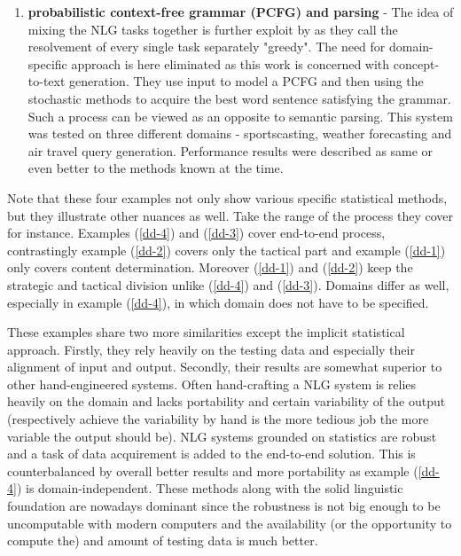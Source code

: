 \begin{enumerate}
	\item \textbf{probabilistic context-free grammar (PCFG) and parsing} - The idea of mixing the NLG tasks together is further exploit by \cite{konstas2013global} as they call the resolvement of every single task separately "greedy". The need for domain-specific approach is here eliminated as this work is concerned with concept-to-text generation. They use input to model a PCFG and then using the stochastic methods to acquire the best word sentence satisfying the grammar. Such a process can be viewed as an opposite to semantic parsing. This system was tested on three different domains - sportscasting, weather forecasting and air travel query generation. Performance results were described as same or even better to the methods known at the time.\label{dd-4}
\end{enumerate}
Note that these four examples not only show various specific statistical methods, but they illustrate other nuances as well. Take the range of the process they cover for instance. Examples (\ref{dd-4}) and (\ref{dd-3}) cover end-to-end process, contrastingly example (\ref{dd-2}) covers only the tactical part and example (\ref{dd-1}) only covers content determination. Moreover (\ref{dd-1}) and (\ref{dd-2}) keep the strategic and tactical division unlike (\ref{dd-4}) and (\ref{dd-3}). Domains differ as well, especially in example (\ref{dd-4}), in which domain does not have to be specified.

These examples share two more similarities except the implicit statistical approach. Firstly, they rely heavily on the testing data and especially their alignment of input and output. Secondly, their results are somewhat superior to other hand-engineered systems. Often hand-crafting a NLG system is relies heavily on the domain and lacks portability and certain variability of the output (respectively achieve the variability by hand is the more tedious job the more variable the output should be). NLG systems grounded on statistics are robust and a task of data acquirement is added to the end-to-end solution. This is counterbalanced by overall better results and more portability as example (\ref{dd-4}) is domain-independent. These methods along with the solid linguistic foundation are nowadays dominant since the robustness is not big enough to be uncomputable with modern computers and the availability (or the opportunity to compute the) and amount of testing data is much better. 